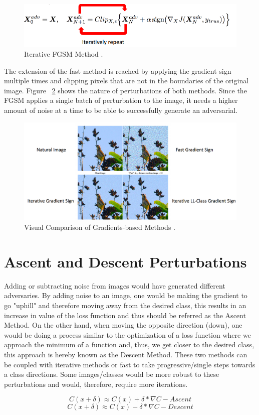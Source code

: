 \begin{figure}[!h]
	\centering
	\includegraphics[scale=0.6]{iter_fgsm.png}
	\caption{Iterative FGSM Method \cite{goodfellow2016}.}
	\label{fig:iter_fgsm_craft}
\end{figure}
The extension of the fast method is reached by applying the gradient sign multiple times and clipping pixels that are not in the boundaries of the original image. Figure ~\ref{fig:iter_single_comp} shows the nature of perturbations of both methods. Since the FGSM applies a single batch of perturbation to the image, it needs a higher amount of noise at a time to be able to successfully generate an adversarial.
\begin{figure}[!h]
	\centering
	\includegraphics[scale=0.4]{iter_single.png}
	\caption{Visual Comparison of Gradients-based Methods \cite{goodfellow2016}.}
	\label{fig:iter_single_comp}
\end{figure}


\section{Ascent and Descent Perturbations}\label{sec:gsm}

Adding or subtracting noise from images would have generated different adversaries. By adding noise to an image, one would be making the gradient to go "uphill" and therefore moving away from the desired class, this results in an increase in value of the loss function and thus should be referred as the Ascent Method. On the other hand, when moving the opposite direction (down), one would be doing a process similar to the optimization of a loss function where we approach the minimum of a function and, thus, we get closer to the desired class, this approach is hereby known as the Descent Method. These two methods can be coupled with iterative methods or fast to take progressive/single steps towards a class directions. Some images/classes would be more robust to these perturbations and would, therefore, require more iterations.

$$ C(x + \delta)\approx C(x) + \delta * \nabla C - Ascent$$
$$ C(x + \delta)\approx C(x) - \delta * \nabla C - Descent$$